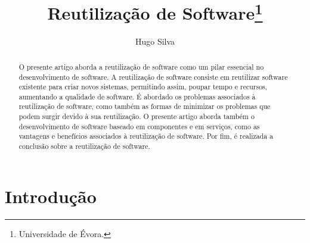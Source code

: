 \documentclass[runningheads]{llncs}
\begin{document}
%
\title{Reutilização de Software\thanks{Universidade de Évora.}}
%
%
\author{Hugo Silva }

%
%
%
\maketitle              %
%
\begin{abstract}

O presente artigo aborda a reutilização de software como um pilar essencial no desenvolvimento de software. A reutilização de software consiste em reutilizar software existente para criar novos sistemas, permitindo assim, poupar tempo e recursos, aumentando a qualidade de software. É abordado os problemas associados à reutilização de software, como também as formas de minimizar os problemas que podem surgir devido à sua reutilização. O presente artigo aborda também o desenvolvimento de software baseado em componentes e em serviços, como as vantagens e benefícios associados à reutilização de software. Por fim, é realizada a conclusão sobre a reutilização de software.

\end{abstract}
%
%
%
\section{Introdução}
\end{document}

